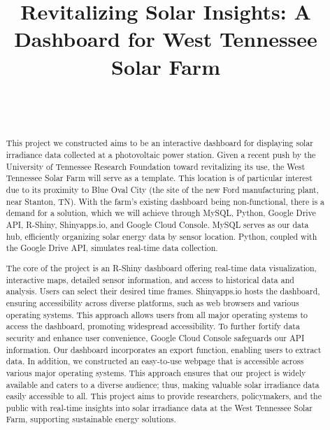\documentclass{sigchi}
\def\plaintitle{Revitalizing Solar Insights: A Dashboard for West Tennessee Solar Farm}
\begin{document}
\title{\plaintitle}

\author{%
  \\
  \\
}

\maketitle
\begin{abstract}
This project we constructed aims to be an interactive dashboard for displaying solar irradiance data collected at a photovoltaic power station. Given a recent push by the University of Tennessee Research Foundation toward revitalizing its use, the West Tennessee Solar Farm will serve as a template. This location is of particular interest due to its proximity to Blue Oval City (the site of the new Ford manufacturing plant, near Stanton, TN). With the farm’s existing dashboard being non-functional, there is a demand for a solution, which we will achieve through MySQL, Python, Google Drive API, R-Shiny, Shinyapps.io, and Google Cloud Console.
MySQL serves as our data hub, efficiently organizing solar energy data by sensor location. Python, coupled with the Google Drive API, simulates real-time data collection. 

The core of the project is an R-Shiny dashboard offering real-time data visualization, interactive maps, detailed sensor information, and access to historical data and analysis. Users can select their desired time frames. Shinyapps.io hosts the dashboard, ensuring accessibility across diverse platforms, such as web browsers and various operating systems. This approach allows users from all major operating systems to access the dashboard, promoting widespread accessibility. To further fortify data security and enhance user convenience, Google Cloud Console safeguards our API information.
Our dashboard incorporates an export function, enabling users to extract data. In addition, we constructed an easy-to-use webpage that is accessible across various major operating systems. This approach ensures that our project is widely available and caters to a diverse audience; thus, making valuable solar irradiance data easily accessible to all. This project aims to provide researchers, policymakers, and the public with real-time insights into solar irradiance data at the West Tennessee Solar Farm, supporting sustainable energy solutions.


\end{abstract}
\end{document}
